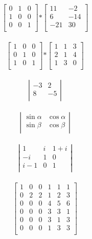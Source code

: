 \documentclass[a4paper]{article}
\begin{document}
$$
\left[ \begin{array}{ccc}
0 & 1 & 0 \\
1 & 0 & 0 \\
0 & 0 & 1 \\
\end{array} \right] 
\mathbf{*}
\left[ \begin{array}{cc}
11 & -2\\
6 & -14\\
-21 & 30\\
\end{array} \right]
$$\\

$$
\left[ \begin{array}{ccc}
1 & 0 & 0 \\
0 & 1 & 0 \\
1 & 0 & 1 \\
\end{array} \right] 
\mathbf{*}
\left[ \begin{array}{ccc}
1 & 1 & 3 \\
2 & 1 & 4 \\
1 & 3 & 0 \\
\end{array} \right]
$$\\

$$
\left| \begin{array}{rr}
-3 & 2\\
8 & -5\\
\end{array} \right|
$$\\

$$
\left| \begin{array}{cc}
\sin\alpha & \cos\alpha\\
\sin\beta & \cos\beta\\
\end{array} \right|
$$\\

$$ 
\left|
\begin{array}{ccc}
1 & i & 1+i \\
-i & 1 & 0\\
i-1 & 0 & 1\\
\end{array}\right| $$\\

$$
\left[ \begin{array}{c|cc|ccc}
1 & 0 & 0 & 1 & 1 & 1\\
\hline
0 & 2 & 2 & 1 & 2 & 3\\
0 & 0 & 0 & 4 & 5 & 6\\
\hline
0 & 0 & 0 & 3 & 3 & 1\\
0 & 0 & 0 & 3 & 1 & 3\\
0 & 0 & 0 & 1 & 3 & 3\\
\end{array} \right]
$$\\
\end{document}
